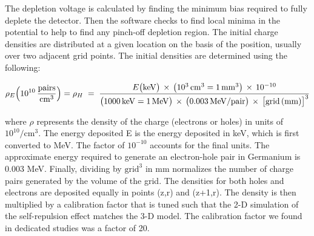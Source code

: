 The depletion voltage is calculated by finding the minimum bias required to fully deplete the detector. Then the software checks to find local minima in the potential to help to find any pinch-off depletion region. The initial charge densities are distributed at a given location on the basis of the position, usually over two adjacent grid points. The initial densities are determined using the following:

\begin{equation}
\rho_E \Bigl(10^{10} \,\frac{\mathrm{pairs}}{\mathrm{cm^3}}\Bigr) = \rho_H  \;=\;
\frac{ E\bigl(\mathrm{keV}\bigr)\,\times\,\bigl(10^{3}\,\mathrm{cm}^{3} = 1\,\mathrm{mm}^3\bigr)\,\times\,10^{-10} }{ \bigl(1000\,\mathrm{keV} = 1\,\mathrm{MeV}\bigr) \,\times\,\bigl(0.003\,\mathrm{MeV/pair}\bigr)\,\times\,\bigl[\text{grid}\,(\mathrm{mm})\bigr]^3 }
\label{eq:density_with_units}
\end{equation}



where $\rho$ represents the density of the charge (electrons or holes) in units of \(10^{10}/\text{cm}^3\). The energy deposited E is the energy deposited in keV, which is first converted to MeV. The factor of \(10^{-10}\) accounts for the final units. The approximate energy required to generate an electron-hole pair in Germanium is $0.003$ MeV. Finally, dividing by \(\text{grid}^3\) in mm normalizes the number of charge pairs generated by the volume of the grid. The densities for both holes and electrons are deposited equally in points (z,r) and (z+1,r). The density is then multiplied by a calibration factor that is tuned such that the 2-D simulation of the self-repulsion effect matches the 3-D model. The calibration factor we found in dedicated studies was a factor of 20.


